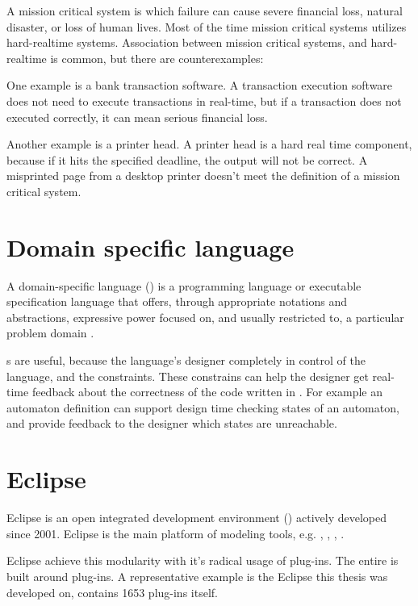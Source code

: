 A mission critical system is which failure can cause severe financial loss, natural disaster, or loss of human lives. Most of the time mission critical systems utilizes hard-realtime systems. Association between mission critical systems, and hard-realtime is common, but there are counterexamples:

One example is a bank transaction software. A transaction execution software does not need to execute transactions in real-time, but if a transaction does not executed correctly, it can mean serious financial loss.

Another example is a printer head. A printer head is a hard real time component, because if it hits the specified deadline, the output will not be correct. A misprinted page from a desktop printer doesn't meet the definition of a mission critical system.

\section{Domain specific language}

A domain-specific language (\dsl) is a programming language or executable specification language that offers, through appropriate notations and abstractions, expressive power focused on, and usually restricted to, a particular problem domain \citep{van2000domain}.

\dsl{}s are useful, because the language's designer completely in control of the language, and the constraints. These constrains can help the designer get real-time feedback about the correctness of the code written in \dsl. For example an automaton definition \dsl can support design time checking states of an automaton, and provide feedback to the designer which states are unreachable.

\section{Eclipse}

Eclipse is an open integrated development environment () actively developed since 2001. Eclipse is the main platform of modeling tools, e.g. \emf, , , .

Eclipse achieve this modularity with it's radical usage of plug-ins. The entire  is built around plug-ins. A representative example is the Eclipse  this thesis was developed on, contains 1653 plug-ins itself.


